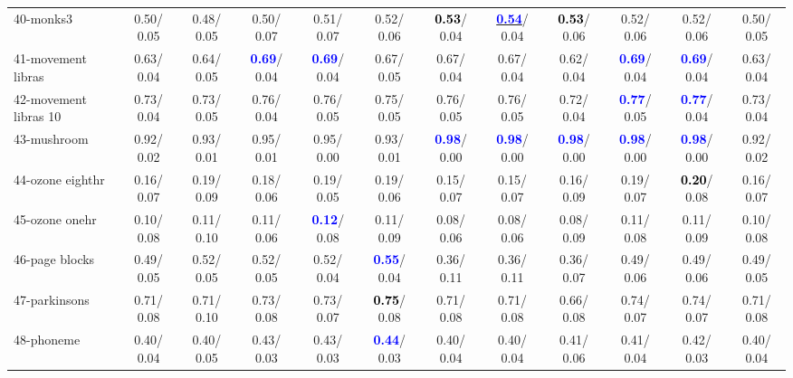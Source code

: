 \begin{table}[h]
\begin{center}
{\begin{tabular}{lc|c|c|c|c|c|c|c|c|c|c}
40-monks3 &   0.50/  0.05 &   0.48/  0.05 &   0.50/  0.07 &   0.51/  0.07 &   0.52/  0.06 & \textcolor{black}{\textbf{  0.53}}/  0.04 & \underline{\textcolor{blue}{\textbf{  0.54}}}/  0.04 & \textcolor{black}{\textbf{  0.53}}/  0.06 &   0.52/  0.06 &   0.52/  0.06 &   0.50/  0.05 \\
41-movement libras &   0.63/  0.04 &   0.64/  0.05 & \textcolor{blue}{\textbf{  0.69}}/  0.04 & \textcolor{blue}{\textbf{  0.69}}/  0.04 &   0.67/  0.05 &   0.67/  0.04 &   0.67/  0.04 &   0.62/  0.04 & \textcolor{blue}{\textbf{  0.69}}/  0.04 & \textcolor{blue}{\textbf{  0.69}}/  0.04 &   0.63/  0.04 \\
42-movement libras 10 &   0.73/  0.04 &   0.73/  0.05 &   0.76/  0.04 &   0.76/  0.05 &   0.75/  0.05 &   0.76/  0.05 &   0.76/  0.05 &   0.72/  0.04 & \textcolor{blue}{\textbf{  0.77}}/  0.05 & \textcolor{blue}{\textbf{  0.77}}/  0.04 &   0.73/  0.04 \\
43-mushroom &   0.92/  0.02 &   0.93/  0.01 &   0.95/  0.01 &   0.95/  0.00 &   0.93/  0.01 & \textcolor{blue}{\textbf{  0.98}}/  0.00 & \textcolor{blue}{\textbf{  0.98}}/  0.00 & \textcolor{blue}{\textbf{  0.98}}/  0.00 & \textcolor{blue}{\textbf{  0.98}}/  0.00 & \textcolor{blue}{\textbf{  0.98}}/  0.00 &   0.92/  0.02 \\
44-ozone eighthr &   0.16/  0.07 &   0.19/  0.09 &   0.18/  0.06 &   0.19/  0.05 &   0.19/  0.06 &   0.15/  0.07 &   0.15/  0.07 &   0.16/  0.09 &   0.19/  0.07 & \textcolor{black}{\textbf{  0.20}}/  0.08 &   0.16/  0.07 \\
45-ozone onehr &   0.10/  0.08 &   0.11/  0.10 &   0.11/  0.06 & \textcolor{blue}{\textbf{  0.12}}/  0.08 &   0.11/  0.09 &   0.08/  0.06 &   0.08/  0.06 &   0.08/  0.09 &   0.11/  0.08 &   0.11/  0.09 &   0.10/  0.08 \\
46-page blocks &   0.49/  0.05 &   0.52/  0.05 &   0.52/  0.05 &   0.52/  0.04 & \textcolor{blue}{\textbf{  0.55}}/  0.04 &   0.36/  0.11 &   0.36/  0.11 &   0.36/  0.07 &   0.49/  0.06 &   0.49/  0.06 &   0.49/  0.05 \\ \hline
47-parkinsons &   0.71/  0.08 &   0.71/  0.10 &   0.73/  0.08 &   0.73/  0.07 & \textcolor{black}{\textbf{  0.75}}/  0.08 &   0.71/  0.08 &   0.71/  0.08 &   0.66/  0.08 &   0.74/  0.07 &   0.74/  0.07 &   0.71/  0.08 \\
48-phoneme &   0.40/  0.04 &   0.40/  0.05 &   0.43/  0.03 &   0.43/  0.03 & \textcolor{blue}{\textbf{  0.44}}/  0.03 &   0.40/  0.04 &   0.40/  0.04 &   0.41/  0.06 &   0.41/  0.04 &   0.42/  0.03 &   0.40/  0.04 \\

\end{tabular}}
\end{center}
\end{table}
